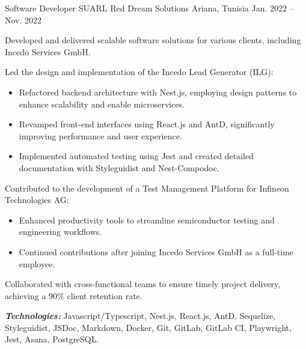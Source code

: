 \begin{cventries}
\cventry
{Software Developer SUARL} %
{Red Dream Solutions} %
{Ariana, Tunisia} %
{Jan. 2022 – Nov. 2022} %
{
  \begin{cvitems} %
    \item {Developed and delivered scalable software solutions for various clients, including Incedo Services GmbH.}
    \item {Led the design and implementation of the Incedo Lead Generator (ILG):
    \begin{itemize}
      \item{Refactored backend architecture with Nest.js, employing design patterns to enhance scalability and enable microservices.}
      \item{Revamped front-end interfaces using React.js and AntD, significantly improving performance and user experience.}
      \item{Implemented automated testing using Jest and created detailed documentation with Styleguidist and Nest-Compodoc.}
    \end{itemize}
    }
    \item {Contributed to the development of a Test Management Platform for Infineon Technologies AG:
      \begin{itemize}
        \item{Enhanced productivity tools to streamline semiconductor testing and engineering workflows.}
        \item{Continued contributions after joining Incedo Services GmbH as a full-time employee.}
      \end{itemize}
    }
    \item {Collaborated with cross-functional teams to ensure timely project delivery, achieving a 90\% client retention rate.}
   \end{cvitems}
   \vspace{5mm}
  \textbf{\textit{Technologies:}} Javascript/Typescript, Nest.js, React.js, AntD, Sequelize, Styleguidist,
   JSDoc, Markdown, Docker, Git, GitLab, GitLab CI, Playwright, Jest, Asana, PostgreSQL.
  \vspace{5mm}
}



\end{cventries}
